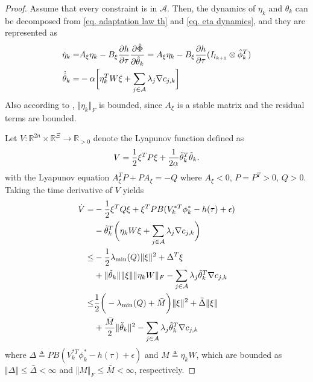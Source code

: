 \documentclass[lettersize,journal]{IEEEtran}
\begin{document}
\begin{proof}
Assume that every constraint is in $\mathcal A$.
Then, the dynamics of $\eta_k$ and $\hat\theta_k$ can be decomposed from \eqref{eq. adaptation law th} and \eqref{eq. eta dynamics}, and they are represented as 
\begin{equation*}
    \begin{aligned}
        \dot\eta_k =
        & 
        A_\xi \eta_k -B_\xi {\partial h\over\partial\tau}{\partial \hat\Phi\over \partial \hat\theta_k}
        =
        A_\xi \eta_k -B_\xi {\partial h\over\partial\tau}(I_{l_{k+1}}\otimes \hat\phi_k^T)\\
        \dot{\hat\theta}_k =
        & -\alpha 
        \bigg[
            \eta_k^TW\xi+
            \sum_{j\in\mathcal{A}}
            \lambda_j\nabla c_{j,k}
        \bigg]
    \end{aligned} 
\end{equation*}
Also according to \cite[Chap.~4 T.~1.9]{RN13}, $\Vert \eta_k\Vert_F$ is bounded, since $A_\xi$ is a stable matrix and the residual terms are bounded.

Let $V: \mathbb R^{2n}\times\mathbb R^\Xi\to\mathbb R_{>0}$ denote the Lyapunov function defined as 
\begin{equation*}
    V = {1\over 2} \xi^T  P\xi +{1\over 2\alpha } \tilde\theta_k ^T  \tilde\theta_k
    .
    \label{eq. Lyapunov func}
\end{equation*}
with the Lyapunov equation $A_\xi^T  P+PA_\xi = -Q$ where $A_\xi<0$, $P=P^T  >0$, $Q>0$.
Taking the time derivative of $V$ yields 
\begin{equation*}
    \begin{aligned}
        \dot V =&
        -{1\over 2}\xi^TQ\xi +\xi^TPB(V^{*T}_k\phi^*_k-h(\tau)+\epsilon)\\
        &
        -\tilde\theta_k^T
        \bigg(
            \eta_kW\xi+\sum_{j\in\mathcal{A} } \lambda_j\nabla c_{j,k}
        \bigg)\\
        \le&
        -{1\over 2} \lambda_\text{min} (Q) \Vert \xi\Vert^2 +\Delta^T\xi \\
        &+
        \Vert \tilde\theta_k\Vert \Vert \xi\Vert \Vert \eta_kW\Vert_F -\sum_{j\in\mathcal{A}}\lambda_j \tilde\theta_k^T\nabla c_{j,k}
        \\
        \le &
        {1\over 2}
        \bigg(
            -\lambda_\text{min}(Q)+\bar M
        \bigg)
        \Vert\xi\Vert^2
        +\bar \Delta \Vert \xi\Vert 
        \\
        &
        +{\bar M\over 2} \Vert\tilde\theta_k\Vert^2 
        -\sum_{j\in\mathcal{A}}\lambda_j \tilde\theta_k^T\nabla c_{j,k}
    \end{aligned}
    \label{eq. dot Vk 1}
\end{equation*}
where $\Delta \triangleq PB(V^{*T}_k\phi^*_k-h(\tau)+\epsilon)$ and $M\triangleq   \eta_kW$, which are bounded as $\Vert\Delta\Vert\le\bar\Delta<\infty$ and $\Vert M\Vert _F\le\bar M<\infty$, respectively.


\end{proof}
\end{document}
